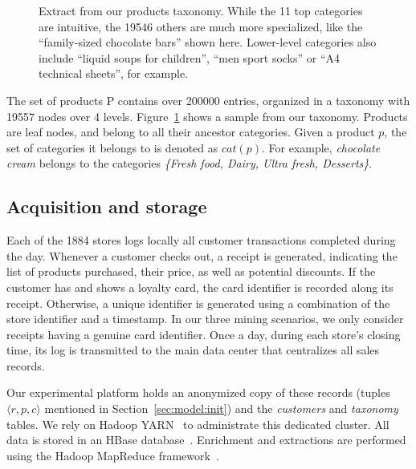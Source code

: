 \begin{figure}
	\centering
	\begin{tikzpicture}[>=latex]
		
	\end{tikzpicture}
	\caption{\label{fig:taxonomy}
		Extract from our products taxonomy.
		While the 11 top categories are intuitive,
		the \num{19546} others are much more specialized,
		like the ``family-sized chocolate bars'' shown here.
		Lower-level categories also include ``liquid soups for children'', ``men sport socks''
		or ``A4 technical sheets'', for example.
	}
\end{figure}


The set of products {\mf P} contains over \num{200000} entries,
organized in a taxonomy with \num{19557} nodes over 4 levels.
Figure~\ref{fig:taxonomy} shows a sample from our taxonomy.
Products are leaf nodes, and belong to all their ancestor categories.
Given a product $p$, the set of categories it belongs to is denoted as $\mathit{cat(p)}$.
For example, {\em chocolate cream} belongs to the categories
{\em \{Fresh food, Dairy, Ultra fresh, Desserts\}}.


\subsection{Acquisition and storage}
\label{sec:archstore}

Each of the \num{1884} stores logs locally all customer
transactions completed during the day.
Whenever a customer checks out, a receipt is generated,
indicating the list of products purchased, their price, as well as potential discounts.
If the customer has and shows a loyalty card, the card identifier is recorded along its receipt.
Otherwise, a unique identifier is generated using a combination of the store identifier and a timestamp.
In our three mining scenarios, we only consider receipts having a genuine card identifier.
Once a day, during each store's closing time, its log is transmitted to the main data center
that centralizes all sales records.

Our experimental platform holds an anonymized copy of these records
(tuples $\langle r, p, c \rangle$ mentioned in Section~\ref{sec:model:init})
and the {\em customers} and {\em taxonomy} tables.
We rely on Hadoop YARN~\cite{yarn} to administrate this dedicated cluster.
All data is stored in an HBase database~\cite{hbase}.
Enrichment and extractions are performed using the Hadoop MapReduce framework~\cite{DeanOSDI04}.

